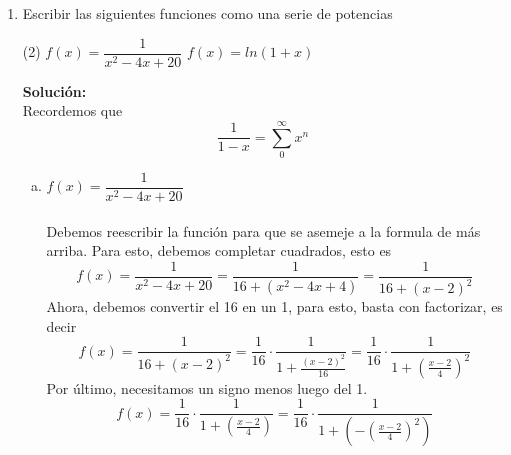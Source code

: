 \documentclass[12pt]{article}
\newenvironment{solucion}
{\begin{mdframed}[backgroundcolor=black!10]
		{\bf Solución:}\\
	}
	{
	\end{mdframed}
}
\newenvironment{preguntas}
{\begin{enumerate}\itemsep12pt
	}
	{
	\end{enumerate}
}
\newcommand{\ra}{\rightarrow}
\begin{document}
\begin{preguntas}
\begin{solucion}
\begin{enumerate}[a)]
\begin{itemize}
\end{itemize}
Finalmente, el intervalo es $[3,5[$
\item $\sum\limits_{n=2}^{\infty}\dfrac{(x-2)^n}{2^{n+1}}$\\
\\
$$\dfrac{1}{R} = \lim\limits_{n \ra \infty} \dfrac{a_{n+1}}{a_n}
= \lim\limits_{n \ra \infty} \dfrac{1}{2^{n+2}}\dfrac{2^{n+1}}{1} = \dfrac{1}{2} \ra R = 2$$
Notemos que el centro es $2$, por lo que debemos evaluar en $x=0$ y $x=4$.
\begin{itemize}
	\item $x=0$\\
	\\
	$\sum\limits_{n=2}^{\infty}\dfrac{(-2)^n}{2^{n+1}} = \sum\limits_{n=2}^{\infty}(-1)^n\dfrac{2^n}{2^{n+1}} = \sum\limits_{n=2}^{\infty}(-1)^n\dfrac{1}{2} \ra \text{divergente}$
	\item $x=4$\\
	\\
	$\sum\limits_{n=2}^{\infty}\dfrac{2^n}{2^{n+1}} = \sum\limits_{n=2}^{\infty}\dfrac{1}{2} \ra \text{divergente}$
\end{itemize}
Finalmente, el intervalo de convergencia corresponde a $]0, 4[$.
\end{enumerate}
\end{solucion}
\item Escribir las siguientes funciones como una serie de potencias
\begin{tasks}(2)
\task $f(x) = \dfrac{1}{x^2-4x+20}$
\task $f(x) = ln(1+x)$
\end{tasks}
\begin{solucion}
Recordemos que $$\dfrac{1}{1-x} = \sum\limits_0^{\infty} x^n$$
\begin{enumerate}[a)]
\item $f(x) = \dfrac{1}{x^2-4x+20}$\\
\\
Debemos reescribir la función para que se asemeje a la formula de más arriba. Para esto, debemos completar cuadrados, esto es
$$f(x) = \dfrac{1}{x^2-4x+20}
= \dfrac{1}{16 + (x^2-4x+4)}
= \dfrac{1}{16 + (x-2)^2}$$
Ahora, debemos convertir el 16 en un 1, para esto, basta con factorizar, es decir
$$ f(x)
= \dfrac{1}{16 + (x-2)^2}
= \dfrac{1}{16}\cdot \dfrac{1}{1 + \frac{(x-2)^2}{16}}
= \dfrac{1}{16} \cdot\dfrac{1}{1 + \left(\frac{x-2}{4}\right)^2}
$$
Por último, necesitamos un signo menos luego del 1.
$$ f(x)
= \dfrac{1}{16} \cdot\dfrac{1}{1 + \left(\frac{x-2}{4}\right)}
= \dfrac{1}{16} \cdot\dfrac{1}{1 + \left(-\left(\frac{x-2}{4}\right)^2\right)}
$$
\end{enumerate}
\end{solucion}
\end{preguntas}
\end{document}
